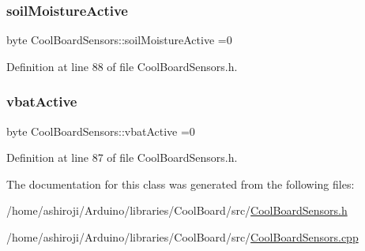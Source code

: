 \subsubsection{\texorpdfstring{soil\+Moisture\+Active}{soilMoistureActive}}
{\footnotesize\ttfamily byte Cool\+Board\+Sensors\+::soil\+Moisture\+Active =0\hspace{0.3cm}{\ttfamily [private]}}



Definition at line 88 of file Cool\+Board\+Sensors.\+h.

\mbox{\label{class_cool_board_sensors_af5039ad760b0ff0aa7eee16c55e81702}} 
\subsubsection{\texorpdfstring{vbat\+Active}{vbatActive}}
{\footnotesize\ttfamily byte Cool\+Board\+Sensors\+::vbat\+Active =0\hspace{0.3cm}{\ttfamily [private]}}



Definition at line 87 of file Cool\+Board\+Sensors.\+h.



The documentation for this class was generated from the following files\+:\begin{DoxyCompactItemize}
\item 
/home/ashiroji/\+Arduino/libraries/\+Cool\+Board/src/\hyperlink{_cool_board_sensors_8h}{Cool\+Board\+Sensors.\+h}\item 
/home/ashiroji/\+Arduino/libraries/\+Cool\+Board/src/\hyperlink{_cool_board_sensors_8cpp}{Cool\+Board\+Sensors.\+cpp}\end{DoxyCompactItemize}
